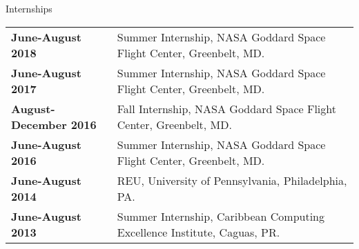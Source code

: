 \documentclass{resume} %
\begin{document}
\begin{rSection}{Internships}

\begin{tabular}{ @{} >{\bfseries}l @{\hspace{6ex}} l }
June-August 2018 & Summer Internship, NASA Goddard Space Flight Center, Greenbelt, MD. \\
June-August 2017 & Summer Internship, NASA Goddard Space Flight Center, Greenbelt, MD. \\
August-December 2016 & Fall Internship, NASA Goddard Space Flight Center, Greenbelt, MD. \\
June-August 2016 & Summer Internship, NASA Goddard Space Flight Center, Greenbelt, MD. \\
June-August 2014 & REU, University of Pennsylvania, Philadelphia, PA. \\
June-August 2013 & Summer Internship, Caribbean Computing Excellence Institute, Caguas, PR. \\
\end{tabular}

\end{rSection}

\end{document}
